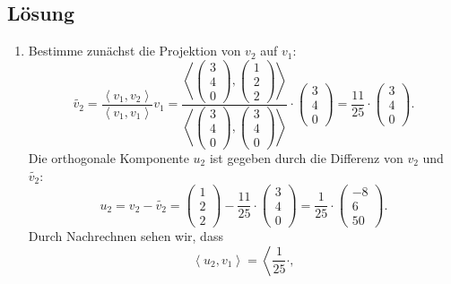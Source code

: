 \documentclass[german,12pt]{homework}
\newcommand{\dotproduct}[2]{\left\langle#1, #2\right\rangle}
\begin{document}
    \subsection*{Lösung}
    \begin{enumerate}
        \item Bestimme zunächst die Projektion von \(v_2\) auf \(v_1\):
        \[\tilde{v_2} = \frac{\dotproduct{v_1}{v_2}}{\dotproduct{v_1}{v_1}}v_1
        = \frac{\dotproduct{\begin{pmatrix}3\\4\\0\end{pmatrix}}{
        \begin{pmatrix}1\\2\\2\end{pmatrix}}}{\dotproduct{\begin{pmatrix}3\\4\\0
        \end{pmatrix}}{\begin{pmatrix}3\\4\\0\end{pmatrix}}} \cdot
        \begin{pmatrix}3\\4\\0\end{pmatrix} = \frac{11}{25} \cdot
        \begin{pmatrix}3\\4\\0\end{pmatrix}.\]
        Die orthogonale Komponente \(u_2\) ist gegeben durch die Differenz von
        \(v_2\) und \(\tilde{v_2}\):
        \[u_2 = v_2 - \tilde{v_2} = \begin{pmatrix}1\\2\\2\end{pmatrix} -
        \frac{11}{25} \cdot \begin{pmatrix}3\\4\\0\end{pmatrix} = \frac{1}{25}
        \cdot \begin{pmatrix}-8\\6\\50\end{pmatrix}.\]
        Durch Nachrechnen sehen wir, dass
        \[\dotproduct{u_2}{v_1} = \dotproduct{\frac{1}{25} \cdot
}\]
\end{enumerate}
\end{document}
